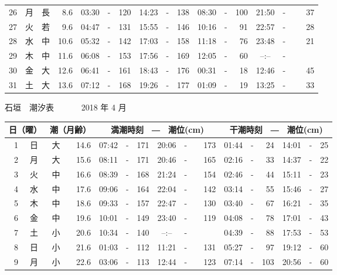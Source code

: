 \documentclass[12pt.a4j]{jsarticle}
\begin{document}
\begin{center}
\begin{table}[ht]
\begin{tabular}{|rc|cr|ccrccr|ccrccr|}
26 & 月 & 長 &  8.6 &  03:30 &-& 120  &  14:23 &-& 138  &   08:30 &-& 100  &   21:50 &-&  37  \\
27 & 火 & 若 &  9.6 &  04:47 &-& 131  &  15:55 &-& 146  &   10:16 &-&  91  &   22:57 &-&  28  \\
28 & 水 & 中 & 10.6 &  05:32 &-& 142  &  17:03 &-& 158  &   11:18 &-&  76  &   23:48 &-&  21  \\
29 & 木 & 中 & 11.6 &  06:08 &-& 153  &  17:56 &-& 169  &   12:05 &-&  60  &   --:-- &-&~~~~~ \\
30 & 金 & 大 & 12.6 &  06:41 &-& 161  &  18:43 &-& 176  &   00:31 &-&  18  &   12:46 &-&  45  \\
31 & 土 & 大 & 13.6 &  07:12 &-& 168  &  19:26 &-& 177  &   01:09 &-&  19  &   13:25 &-&  33  \\
   \hline
   \end{tabular}
\end{table}
\newpage
 {\LARGE 石垣　潮汐表　　　}
 {\large 2018 年  4 月}\\
 \begin{table}[ht]
    \begin{tabular}{|rc|cr|ccrccr|ccrccr|}
    \hline
    \multicolumn{2}{|c|}{日（曜）} & \multicolumn{2}{c|}{潮（月齢）} & \multicolumn{6}{c|}{満潮時刻　―　潮位(cm)} & \multicolumn{6}{c|}{干潮時刻　―　潮位(cm)} \\
 \hline
 1 & 日 & 大 & 14.6 &  07:42 &-& 171  &  20:06 &-& 173  &   01:44 &-&  24  &   14:01 &-&  25  \\
 2 & 月 & 大 & 15.6 &  08:11 &-& 171  &  20:46 &-& 165  &   02:16 &-&  33  &   14:37 &-&  22  \\
 3 & 火 & 中 & 16.6 &  08:39 &-& 168  &  21:24 &-& 154  &   02:46 &-&  44  &   15:11 &-&  23  \\
 4 & 水 & 中 & 17.6 &  09:06 &-& 164  &  22:04 &-& 142  &   03:14 &-&  55  &   15:46 &-&  27  \\
 5 & 木 & 中 & 18.6 &  09:33 &-& 157  &  22:47 &-& 130  &   03:40 &-&  67  &   16:21 &-&  35  \\
 6 & 金 & 中 & 19.6 &  10:01 &-& 149  &  23:40 &-& 119  &   04:08 &-&  78  &   17:01 &-&  43  \\
 7 & 土 & 小 & 20.6 &  10:34 &-& 140  &  --:-- &-&~~~~~ &   04:39 &-&  88  &   17:53 &-&  53  \\
 8 & 日 & 小 & 21.6 &  01:03 &-& 112  &  11:21 &-& 131  &   05:27 &-&  97  &   19:12 &-&  60  \\
 9 & 月 & 小 & 22.6 &  03:06 &-& 113  &  12:44 &-& 123  &   07:14 &-& 103  &   20:56 &-&  60  \\

\end{tabular}
\end{table}
\end{center}
\end{document}

